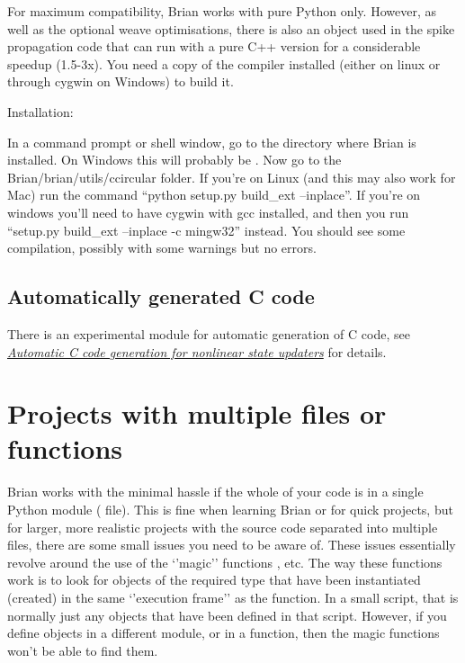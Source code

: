 \documentclass[letterpaper,10pt,english]{manual}
\begin{document}
For maximum compatibility, Brian works with pure Python only. However, as well as the optional
weave optimisations, there is also an object used in the spike propagation code that can run
with a pure C++ version for a considerable speedup (1.5-3x). You need a copy of the  compiler
installed (either on linux or through cygwin on Windows) to build it.

Installation:

In a command prompt or shell window, go to the directory where Brian is installed. On Windows this
will probably be . Now
go to the Brian/brian/utils/ccircular folder. If you're on Linux (and this may also work for Mac) run
the command ``python setup.py build\_ext --inplace''. If you're on windows you'll need to have cygwin with gcc
installed, and then you run ``setup.py build\_ext --inplace -c mingw32'' instead. You should see some
compilation, possibly with some warnings but no errors.


\subsection{Automatically generated C code}

There is an experimental module for automatic generation of C code, see \hyperlink{ccodegen}{\emph{Automatic C code generation for nonlinear state updaters}} for details.

\resetcurrentobjects
{}

\hypertarget{projects-with-multiple-files}{}\section{Projects with multiple files or functions}

Brian works with the minimal hassle if the whole of your code is in a
single Python module ( file). This is fine when learning Brian
or for quick projects, but for larger, more realistic projects with
the source code separated into multiple files, there are some small
issues you need to be aware of. These issues essentially revolve
around the use of the `'magic'' functions \hyperlink{brian.run}{}, etc. The way
these functions work is to look for objects of the required type that
have been instantiated (created) in the same `'execution frame'' as
the \hyperlink{brian.run}{} function. In a small script, that is normally just
any objects that have been defined in that script. However, if you
define objects in a different module, or in a function, then the
magic functions won't be able to find them.
\end{document}
